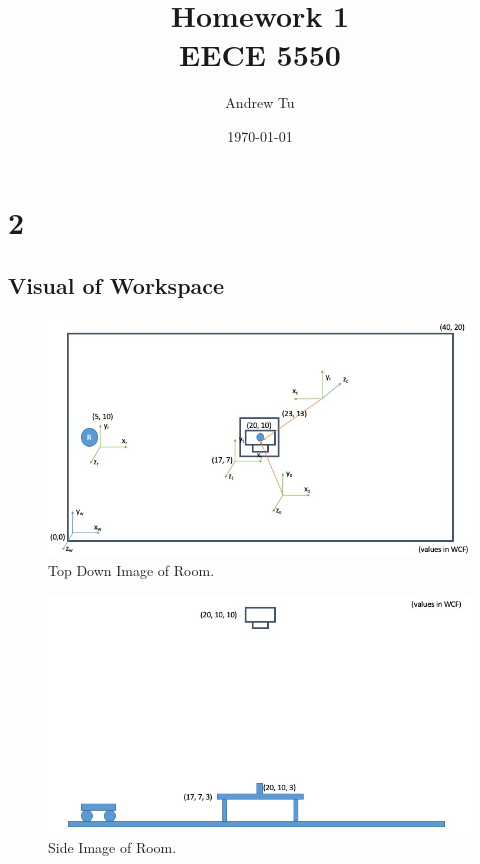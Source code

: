 \documentclass[11pt, oneside]{article}   	%
\title{Homework 1 \\
	\large EECE 5550}
\author{Andrew Tu}
\date{\today}							%
\begin{document}
\maketitle
\newpage

\section{2}

\subsection{Visual of Workspace}
\begin{figure}[h]
   \centering
   \includegraphics[width=.75\textwidth]{../layout/top_down.jpg} %
   \caption{Top Down Image of Room.}
   \label{fig:top_down}
\end{figure}

\begin{figure}[h]
   \centering
   \includegraphics[width=.75\textwidth]{../layout/side.jpg} %
   \caption{Side Image of Room.}
   \label{fig:side}
\end{figure}
\end{document}
